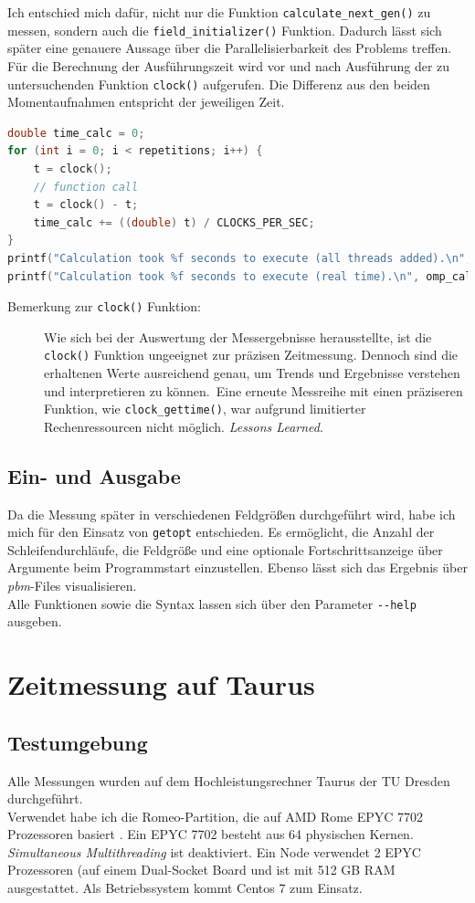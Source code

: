 \documentclass[german,plainarticle,hyperref,utf8]{zihpub}
\begin{document}
	Ich entschied mich dafür, nicht nur die Funktion \texttt{calculate\_next\_gen()} zu messen, sondern auch die \texttt{field\_initializer()} Funktion. Dadurch lässt sich später eine genauere Aussage über die Parallelisierbarkeit des Problems treffen. Für die Berechnung der Ausführungszeit wird vor und nach Ausführung der zu untersuchenden Funktion \texttt{clock()} aufgerufen. Die Differenz aus den beiden Momentaufnahmen entspricht der jeweiligen Zeit.\\
	\begin{lstlisting}[language=C, caption=Berechnung der Ausführungszeit eines \textit{function calls}]
double time_calc = 0;
for (int i = 0; i < repetitions; i++) {
	t = clock();
	// function call
	t = clock() - t;
	time_calc += ((double) t) / CLOCKS_PER_SEC;
}
printf("Calculation took %f seconds to execute (all threads added).\n", time_calc);
printf("Calculation took %f seconds to execute (real time).\n", omp_calc);
\end{lstlisting}
	\begin{description}
		\item[Bemerkung zur \texttt{clock()} Funktion:] Wie sich bei der Auswertung der Messergebnisse herausstellte, ist die \texttt{clock()} Funktion ungeeignet zur präzisen Zeitmessung. Dennoch sind die erhaltenen Werte ausreichend genau, um Trends und Ergebnisse verstehen und interpretieren zu können.\
		Eine erneute Messreihe mit einen präziseren Funktion, wie \texttt{clock\_gettime()}, war aufgrund limitierter Rechenressourcen nicht möglich. \textit{Lessons Learned}.
	\end{description}
	
	\subsection{Ein- und Ausgabe}
	Da die Messung später in verschiedenen Feldgrößen durchgeführt wird, habe ich mich für den Einsatz von \verb|getopt| entschieden. Es ermöglicht, die Anzahl der Schleifendurchläufe, die Feldgröße und eine optionale Fortschrittsanzeige über Argumente beim Programmstart einzustellen.
	Ebenso lässt sich das Ergebnis über \textit{pbm}-Files visualisieren.\\
	Alle Funktionen sowie die Syntax lassen sich über den Parameter \texttt{-{}-help} ausgeben.
	\newpage
	\section{Zeitmessung auf Taurus}
	\subsection{Testumgebung} \label{umgebung}
	Alle Messungen wurden auf dem Hochleistungsrechner Taurus der TU Dresden durchgeführt.\\
	Verwendet habe ich die Romeo-Partition, die auf AMD Rome EPYC 7702 Prozessoren basiert \cite{hpc}. Ein EPYC 7702 besteht aus 64 physischen Kernen. \textit{Simultaneous Multithreading} ist deaktiviert. Ein Node verwendet 2 EPYC Prozessoren (auf einem Dual-Socket Board und ist mit 512 GB RAM ausgestattet. Als Betriebssystem kommt Centos 7 zum Einsatz.\\
	
\end{document}
